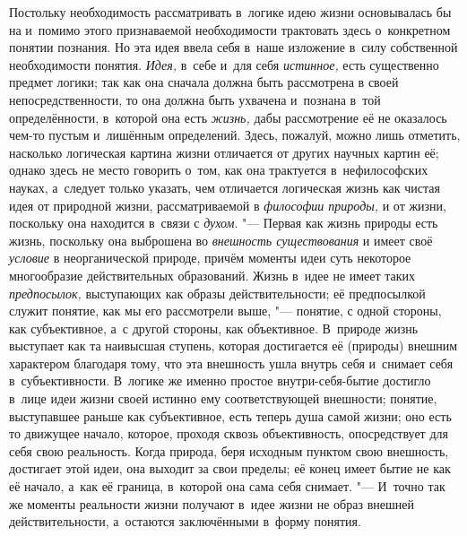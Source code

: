 Постольку необходимость рассматривать в~логике идею жизни
основывалась бы на и~помимо этого признаваемой необходимости трактовать
здесь о~конкретном понятии познания. Но эта идея ввела себя в~наше
изложение в~силу собственной необходимости понятия.
{\em Идея,} в~себе и~для
себя {\em истинное,} есть
существенно предмет логики; так как она сначала должна быть рассмотрена в
своей непосредственности, то она должна быть ухвачена и~познана в~той
определённости, в~которой она есть
{\em жизнь,} дабы
рассмотрение её не оказалось чем-то пустым и~лишённым определений. Здесь,
пожалуй, можно лишь отметить, насколько логическая картина жизни отличается
от других научных картин её; однако здесь не место говорить о~том, как она
трактуется в~нефилософских науках, а~следует только указать, чем отличается
логическая жизнь как чистая идея от природной жизни, рассматриваемой в
{\em философии природы,}
и от жизни, поскольку она находится в~связи с
{\em духом}. "--- Первая как
жизнь природы есть жизнь, поскольку она выброшена во
{\em внешность существования}
и имеет своё
{\em условие} в
неорганической природе, причём моменты идеи суть некоторое многообразие
действительных образований. Жизнь в~идее не имеет таких
{\em предпосылок,}
выступающих как образы действительности; её предпосылкой
служит понятие, как мы его рассмотрели выше, "--- понятие, с
одной стороны, как субъективное, а~с другой стороны, как объективное.
В~природе жизнь выступает как та наивысшая ступень, которая достигается её
(природы) внешним характером благодаря тому, что эта внешность ушла внутрь
себя и~снимает себя в~субъективности. В~логике же именно простое
внутри-себя-бытие достигло в~лице идеи жизни своей истинно ему
соответствующей внешности; понятие, выступавшее раньше как субъективное,
есть теперь душа самой жизни; оно есть то движущее начало, которое, проходя
сквозь объективность, опосредствует для себя свою реальность. Когда
природа, беря исходным пунктом свою внешность, достигает этой идеи, она
выходит за свои пределы; её конец имеет бытие не как её начало, а~как её
граница, в~которой она сама себя снимает. "--- И~точно так же
моменты реальности жизни получают в~идее жизни не образ
внешней действительности, а~остаются заключёнными в~форму понятия.

